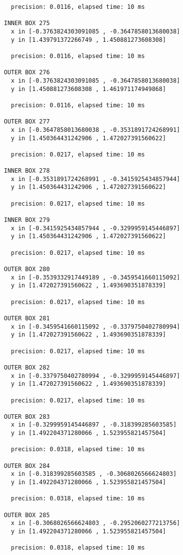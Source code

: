 \begin{verbatim}
  precision: 0.0116, elapsed time: 10 ms

INNER BOX 275
  x in [-0.3763824303091085 , -0.3647858013680038]
  y in [1.439791372266749 , 1.450881273608308]

  precision: 0.0116, elapsed time: 10 ms

OUTER BOX 276
  x in [-0.3763824303091085 , -0.3647858013680038]
  y in [1.450881273608308 , 1.461971174949868]

  precision: 0.0116, elapsed time: 10 ms

OUTER BOX 277
  x in [-0.3647858013680038 , -0.3531891724268991]
  y in [1.450364431242906 , 1.472027391560622]

  precision: 0.0217, elapsed time: 10 ms

INNER BOX 278
  x in [-0.3531891724268991 , -0.3415925434857944]
  y in [1.450364431242906 , 1.472027391560622]

  precision: 0.0217, elapsed time: 10 ms

INNER BOX 279
  x in [-0.3415925434857944 , -0.3299959145446897]
  y in [1.450364431242906 , 1.472027391560622]

  precision: 0.0217, elapsed time: 10 ms

OUTER BOX 280
  x in [-0.3539332917449189 , -0.3459541660115092]
  y in [1.472027391560622 , 1.493690351878339]

  precision: 0.0217, elapsed time: 10 ms

OUTER BOX 281
  x in [-0.3459541660115092 , -0.3379750402780994]
  y in [1.472027391560622 , 1.493690351878339]

  precision: 0.0217, elapsed time: 10 ms

OUTER BOX 282
  x in [-0.3379750402780994 , -0.3299959145446897]
  y in [1.472027391560622 , 1.493690351878339]

  precision: 0.0217, elapsed time: 10 ms

OUTER BOX 283
  x in [-0.3299959145446897 , -0.318399285603585]
  y in [1.492204371280066 , 1.523955821457504]

  precision: 0.0318, elapsed time: 10 ms

OUTER BOX 284
  x in [-0.318399285603585 , -0.3068026566624803]
  y in [1.492204371280066 , 1.523955821457504]

  precision: 0.0318, elapsed time: 10 ms

OUTER BOX 285
  x in [-0.3068026566624803 , -0.2952060277213756]
  y in [1.492204371280066 , 1.523955821457504]

  precision: 0.0318, elapsed time: 10 ms


\end{verbatim}
